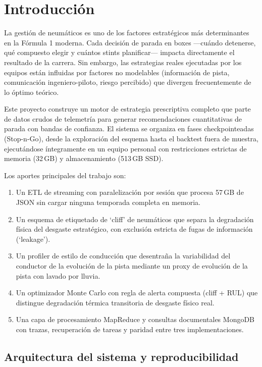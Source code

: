 \documentclass[conference]{IEEEtran}
\begin{document}
\section{Introducción}

La gestión de neumáticos es uno de los factores estratégicos más determinantes
en la Fórmula 1 moderna. Cada decisión de parada en boxes —cuándo detenerse,
qué compuesto elegir y cuántos stints planificar— impacta directamente el
resultado de la carrera. Sin embargo, las estrategias reales ejecutadas por
los equipos están influidas por factores no modelables (información de pista,
comunicación ingeniero-piloto, riesgo percibido) que divergen frecuentemente
de lo óptimo teórico.

Este proyecto construye un motor de estrategia prescriptiva completo que
parte de datos crudos de telemetría para generar recomendaciones cuantitativas
de parada con bandas de confianza. El sistema se organiza en fases
checkpointeadas (Stop-n-Go), desde la exploración del esquema hasta el
backtest fuera de muestra, ejecutándose íntegramente en un equipo personal
con restricciones estrictas de memoria (32\,GB) y almacenamiento (513\,GB SSD).

Los aportes principales del trabajo son:
\begin{enumerate}
  \item Un ETL de streaming con paralelización por sesión que procesa 57\,GB
        de JSON sin cargar ninguna temporada completa en memoria.
  \item Un esquema de etiquetado de `cliff' de neumáticos que separa la
        degradación física del desgaste estratégico, con exclusión estricta
        de fugas de información (`leakage').
  \item Un profiler de estilo de conducción que desentraña la variabilidad
        del conductor de la evolución de la pista mediante un proxy de
        evolución de la pista con lavado por lluvia.
  \item Un optimizador Monte Carlo con regla de alerta compuesta (cliff +
        RUL) que distingue degradación térmica transitoria de desgaste
        físico real.
  \item Una capa de procesamiento MapReduce y consultas documentales MongoDB
        con trazas, recuperación de tareas y paridad entre tres implementaciones.
\end{enumerate}

\subsection{Arquitectura del sistema y reproducibilidad}
\end{document}
